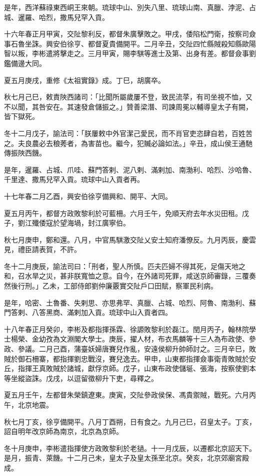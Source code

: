 \begin{pinyinscope}
是年，西洋蘇祿東西峒王來朝。琉球中山、別失八里、琉球山南、真臘、浡泥、占城、暹羅、哈烈，撒馬兒罕入貢。

十六年春正月甲寅，交阯黎利反，都督朱廣擊敗之。甲戌，倭陷松門衛，按察司僉事石魯坐誅。興安伯徐亨、都督夏貴備開平。二月辛丑，交阯四忙縣賊殺知縣歐陽智以叛，李彬遣將擊走之。三月甲寅，賜李騏等進士及第、出身有差。都督僉事劉鑑備邊大同。

夏五月庚戌，重修《太祖實錄》成。丁巳，胡廣卒。

秋七月己巳，敕責陜西諸司：「比聞所屬歲屢不登，致民流莩，有司坐視不恤，又不以聞，其咎安在。其速發倉儲振之。」贊善梁潛、司諫周冕以輔導皇太子有闕，皆下獄死。

冬十二月戊子，諭法司：「朕屢敕中外官潔己愛民，而不肖官吏恣肆自若，百姓苦之。夫良農必去稂莠者，為害苗也。繼今，犯贓必論如法。」辛丑，成山侯王通馳傳振陜西饑。

是年，暹羅、占城、爪哇、蘇門答剌、泥八剌、滿剌加、南渤利、哈烈、沙哈魯、千里達、撒馬兒罕入貢。琉球中山入貢者再。

十七年春二月乙酉，興安伯徐亨備興和、開平、大同。

夏五月丙午，都督方政敗黎利於可藍柵。六月壬午，免順天府去年水災田租。戊子，劉江殲倭寇於望海堝，封江廣寧伯。

秋七月庚申，鄭和還。八月，中官馬騏激交阯乂安土知府潘僚反。九月丙辰，慶雲見，禮臣請表賀，不許。

冬十二月庚辰，諭法司曰：「刑者，聖人所慎。匹夫匹婦不得其死，足傷天地之和，召水旱之災，甚非朕寬恤之意。自今，在外諸司死罪，咸送京師審錄，三覆奏然後行刑。」乙未，工部侍郎劉仲廉覈實交阯戶口田賦，察軍民利病。

是年，哈密、土魯番、失剌思、亦思弗罕、真臘、占城、哈烈、阿魯、南渤利、蘇門答剌、八答黑商、滿剌加入貢。琉球中山入貢者四。

十八年春正月癸卯，李彬及都指揮孫霖、徐謜敗黎利於磊江。閏月丙子，翰林院學士楊榮、金幼孜為文淵閣大學士。庚辰，擢人材，布衣馬麟等十三人為布政使、參政、參議。二月己酉，蒲臺妖婦唐賽兒作亂，安遠侯柳升帥師討之。三月辛巳，敗賊於御石柵寨，都指揮劉忠戰沒，賽兒逸去。甲申，山東都指揮僉事衛青敗賊於安丘，指揮王真敗賊於諸城，獻俘京師。戊子，山東布政使儲埏、張海，按察使劉本等坐縱盜誅。戊戌，以逗留徵柳升下吏，尋釋之。

夏五月壬午，左都督朱榮鎮遼東。庚寅，交阯參政侯保、馮貴禦賊，戰死。六月丙午，北京地震。

秋七月丁亥，徐亨備開平。八月丁酉朔，日有食之。九月己巳，召皇太子。丁亥，詔自明年改京師為南京，北京為京師。

冬十月庚申，李彬遣指揮使方政敗黎利於老撾。十一月戊辰，以遷都北京詔天下。是月，振青、萊饑。十二月己未，皇太子及皇太孫至北京。癸亥，北京郊廟宮殿成。


\end{pinyinscope}
